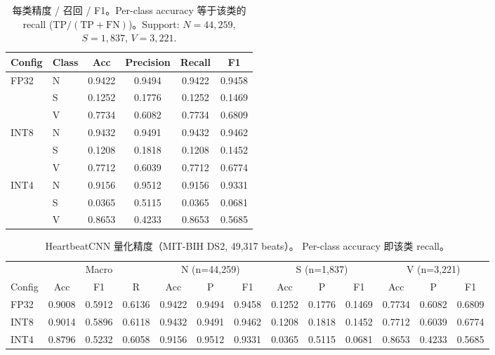 \begin{table}[t]
\centering
\caption{每类精度 / 召回 / F1。Per-class accuracy 等于该类的 recall
($\mathrm{TP}/(\mathrm{TP}+\mathrm{FN})$)。Support: $N\!=\!44{,}259$,
$S\!=\!1{,}837$, $V\!=\!3{,}221$.}
\label{tab:quant-perclass}
\setlength{\tabcolsep}{4pt}
\begin{tabular}{l l cccc}
\toprule
Config & Class & Acc & Precision & Recall & F1 \\
\midrule
\multirow{3}{*}{FP32}
 & N & 0.9422 & 0.9494 & 0.9422 & 0.9458 \\
 & S & 0.1252 & 0.1776 & 0.1252 & 0.1469 \\
 & V & 0.7734 & 0.6082 & 0.7734 & 0.6809 \\
\midrule
\multirow{3}{*}{INT8}
 & N & 0.9432 & 0.9491 & 0.9432 & 0.9462 \\
 & S & 0.1208 & 0.1818 & 0.1208 & 0.1452 \\
 & V & 0.7712 & 0.6039 & 0.7712 & 0.6774 \\
\midrule
\multirow{3}{*}{INT4}
 & N & 0.9156 & 0.9512 & 0.9156 & 0.9331 \\
 & S & 0.0365 & 0.5115 & 0.0365 & 0.0681 \\
 & V & 0.8653 & 0.4233 & 0.8653 & 0.5685 \\
\bottomrule
\end{tabular}
\end{table}


\begin{table}[t]
\centering
\caption{HeartbeatCNN 量化精度（MIT-BIH DS2, 49{,}317 beats）。
Per-class accuracy 即该类 recall。}
\label{tab:quant-all}
\setlength{\tabcolsep}{4pt}
\small
\begin{tabular}{l ccc ccc ccc ccc}
\toprule
 & \multicolumn{3}{c}{Macro} & \multicolumn{3}{c}{N (n=44{,}259)} & \multicolumn{3}{c}{S (n=1{,}837)} & \multicolumn{3}{c}{V (n=3{,}221)} \\
\cmidrule(lr){2-4} \cmidrule(lr){5-7} \cmidrule(lr){8-10} \cmidrule(lr){11-13}
Config & Acc & F1 & R & Acc & P & F1 & Acc & P & F1 & Acc & P & F1 \\
\midrule
FP32 & 0.9008 & 0.5912 & 0.6136 & 0.9422 & 0.9494 & 0.9458 & 0.1252 & 0.1776 & 0.1469 & 0.7734 & 0.6082 & 0.6809 \\
INT8 & 0.9014 & 0.5896 & 0.6118 & 0.9432 & 0.9491 & 0.9462 & 0.1208 & 0.1818 & 0.1452 & 0.7712 & 0.6039 & 0.6774 \\
INT4 & 0.8796 & 0.5232 & 0.6058 & 0.9156 & 0.9512 & 0.9331 & 0.0365 & 0.5115 & 0.0681 & 0.8653 & 0.4233 & 0.5685 \\
\bottomrule
\end{tabular}
\end{table}
